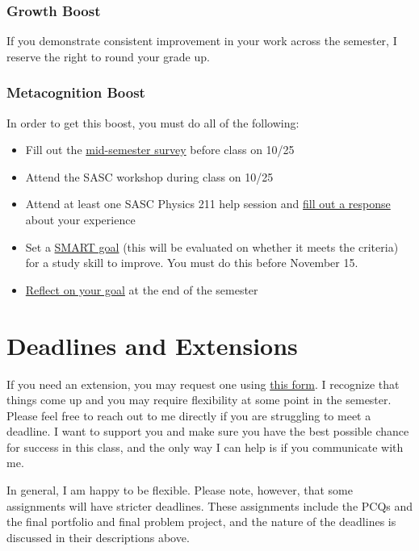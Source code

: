 \documentclass[
  letterpaper,
  DIV=11,
  numbers=noendperiod]{scrartcl}
\providecommand{\tightlist}{%
  \setlength{\itemsep}{0pt}\setlength{\parskip}{0pt}}\usepackage{longtable,booktabs,array}
\begin{document}
\subsubsection{Growth Boost}

If you demonstrate consistent improvement in your work across the
semester, I reserve the right to round your grade up.

\subsubsection{Metacognition Boost}

In order to get this boost, you must do all of the following:

\begin{itemize}
\tightlist
\item
  Fill out the \href{https://forms.gle/K3kqhLWRtxuAd45U8}{mid-semester
  survey} before class on 10/25
\item
  Attend the SASC workshop during class on 10/25
\item
  Attend at least one SASC Physics 211 help session and
  \href{https://forms.gle/qudMKQ4FJX76pBef9}{fill out a response} about
  your experience
\item
  Set a
  \href{https://docs.google.com/forms/d/e/1FAIpQLSfMTioS5vSv3KYcqxJR8C2WfCp9XX4KIKFMHYWWeeLbHjmJjw/viewform}{SMART
  goal} (this will be evaluated on whether it meets the criteria) for a
  study skill to improve. You must do this before November 15.
\item
  \href{https://forms.gle/Cenw9TjhTMgz2qod7}{Reflect on your goal} at
  the end of the semester
\end{itemize}

\section{Deadlines and Extensions}\label{deadlines}

If you need an extension, you may request one using
\href{https://forms.gle/eFx7y7FoSdoukKGC6}{this form}. I recognize that
things come up and you may require flexibility at some point in the
semester. Please feel free to reach out to me directly if you are
struggling to meet a deadline. I want to support you and make sure you
have the best possible chance for success in this class, and the only
way I can help is if you communicate with me.

In general, I am happy to be flexible. Please note, however, that some
assignments will have stricter deadlines. These assignments include the
PCQs and the final portfolio and final problem project, and the nature
of the deadlines is discussed in their descriptions above.
\end{document}
